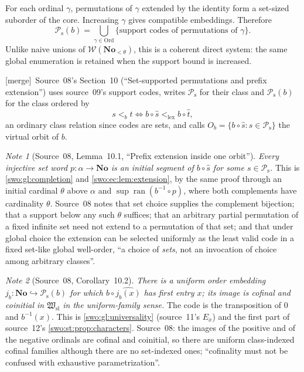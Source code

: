 \documentclass[11pt]{article}
\theoremstyle{definition}
\theoremstyle{remark}
\newtheorem{note}[note]{Note}
\newcommand{\No}{\mathbf{No}}
\newcommand{\Ord}{\mathrm{Ord}}
\newcommand{\WO}{\mathcal W}
\newcommand{\Hsl}{\mathfrak W_{\mathrm{sl}}}
\newcommand{\Psupp}{\mathcal P_{\mathrm{s}}}
\newcommand{\lex}{\mathrm{lex}}
\newcommand{\ran}{\operatorname{ran}}
\newcommand{\emb}{\hookrightarrow}
\newcommand{\merge}{\textsf{[merge]}}
\begin{document}
For each ordinal $\gamma$, permutations of $\gamma$ extended by the
identity form a set-sized suborder of the core. Increasing $\gamma$
gives compatible embeddings. Therefore
\[
          \Psupp(b)=\bigcup_{\gamma\in\Ord}
             \{\text{support codes of permutations of }\gamma\}.
\]
Unlike naive unions of $\WO(\No_{<\theta})$, this is a coherent direct system:
the same global enumeration is retained when the support bound is
increased.


\merge\ Source~08's Section~10 (``Set-supported permutations and prefix
extension'')\label{swo:sk:sec:prefix} uses source~09's support codes, writes
$\Psupp$ for their class and $\Psupp(b)$ for the class ordered by
\[
 s<_{b}t\iff b\circ\widehat s<_{\lex}b\circ\widehat t,
 \tag{S08.8}\label{swo:sk:eq:t8}
\]
an ordinary class relation since codes are sets, and calls
$O_b=\{b\circ\widehat s:s\in\Psupp\}$ the virtual orbit of $b$.

\begin{note}[Source~08, Lemma~10.1, ``Prefix extension inside one orbit'']\label{swo:sk:lem:extension}
\emph{Every injective set word $p:\alpha\to\No$ is an initial segment of
$b\circ\widehat s$ for some $s\in\Psupp$.} This is \cref{swo:gl:completion} and
\cref{swo:ec:lem:extension}, by the same proof through an initial cardinal
$\theta$ above $\alpha$ and $\sup\ran(b^{-1}\circ p)$, where both complements
have cardinality $\theta$. Source~08 notes that set choice supplies the
complement bijection; that a support below any such $\theta$ suffices; that an
arbitrary partial permutation of a fixed infinite set need not extend to a
permutation of that set; and that under global choice the extension can be
selected uniformly as the least valid code in a fixed set-like global
well-order, ``a choice of \emph{sets}, not an invocation of choice among
arbitrary classes''.
\end{note}

\begin{note}[Source~08, Corollary~10.2]\label{swo:sk:cor:firstentry}
\emph{There is a uniform order embedding $j_b:\No\emb\Psupp(b)$ for which
$b\circ\widehat{j_b(x)}$ has first entry $x$; its image is cofinal and
coinitial in $\Hsl$ in the uniform-family sense.} The code is the transposition
of $0$ and $b^{-1}(x)$. This is \cref{swo:gl:universality} (source~11's $E_x$)
and the first part of source~12's \cref{swo:st:prop:characters}. Source~08:
the images of the positive and of the negative ordinals are cofinal and
coinitial, so there are uniform class-indexed cofinal families although there
are no set-indexed ones; ``cofinality must not be confused with exhaustive
parametrization''.
\end{note}
\end{document}

